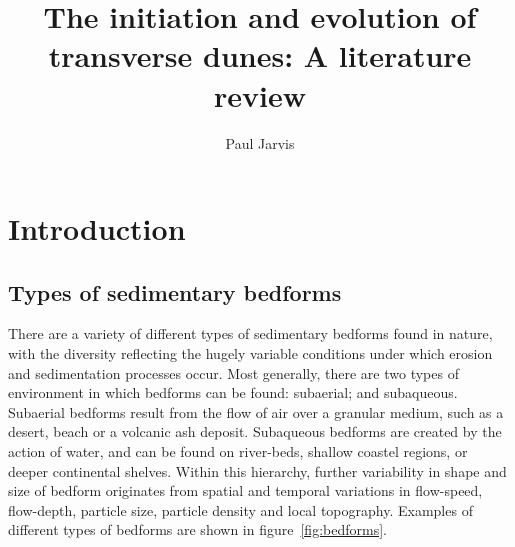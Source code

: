 \documentclass[12pt]{article}
\title{The initiation and evolution of transverse dunes: A literature review}
\date{}
\author{Paul Jarvis}
\begin{document}
\thispagestyle{empty}

\maketitle

\section{Introduction}
\label{sec:intro}

\subsection{Types of sedimentary bedforms}
\label{subsec:sed_bed}

There are a variety of different types of sedimentary bedforms found in nature, with the diversity reflecting the hugely variable conditions under which erosion and sedimentation processes occur. Most generally, there are two types of environment in which bedforms can be found: subaerial; and subaqueous. Subaerial bedforms result from the flow of air over a granular medium, such as a desert, beach or a volcanic ash deposit. Subaqueous bedforms are created by the action of water, and can be found on river-beds, shallow coastel regions, or deeper continental shelves. Within this hierarchy, further variability in shape and size of bedform originates from spatial and temporal variations in flow-speed, flow-depth, particle size, particle density and local topography. Examples of different types of bedforms are shown in figure~\ref{fig:bedforms}.
\end{document}
